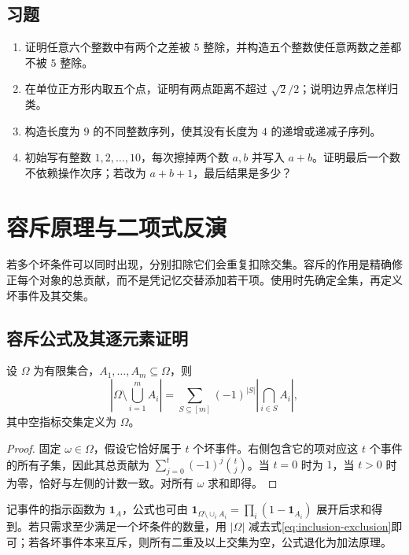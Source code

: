\documentclass[UTF8,12pt,a4paper,fontset=fandol]{ctexbook}
\begin{document}
\section{习题}
\begin{enumerate}
  \item\label{ex:pigeonhole-1} 证明任意六个整数中有两个之差被 $5$ 整除，并构造五个整数使任意两数之差都不被 $5$ 整除。
  \item\label{ex:pigeonhole-2} 在单位正方形内取五个点，证明有两点距离不超过 $\sqrt2/2$；说明边界点怎样归类。
  \item\label{ex:pigeonhole-3} 构造长度为 $9$ 的不同整数序列，使其没有长度为 $4$ 的递增或递减子序列。
  \item\label{ex:pigeonhole-4} 初始写有整数 $1,2,\ldots,10$，每次擦掉两个数 $a,b$ 并写入 $a+b$。证明最后一个数不依赖操作次序；若改为 $a+b+1$，最后结果是多少？
\end{enumerate}

\chapter{容斥原理与二项式反演}
\label{ch:inclusion-exclusion}

若多个坏条件可以同时出现，分别扣除它们会重复扣除交集。容斥的作用是精确修正每个对象的总贡献，而不是凭记忆交替添加若干项。使用时先确定全集，再定义坏事件及其交集。

\section{容斥公式及其逐元素证明}

\begin{theorem}
设 $\Omega$ 为有限集合，$A_1,\ldots,A_m\subseteq\Omega$，则
\begin{equation}
  \left|\Omega\setminus\bigcup_{i=1}^m A_i\right|
  =\sum_{S\subseteq[m]}(-1)^{|S|}
    \left|\bigcap_{i\in S}A_i\right|,
  \label{eq:inclusion-exclusion}
\end{equation}
其中空指标交集定义为 $\Omega$。
\end{theorem}
\begin{proof}
固定 $\omega\in\Omega$，假设它恰好属于 $t$ 个坏事件。右侧包含它的项对应这 $t$ 个事件的所有子集，因此其总贡献为 $\sum_{j=0}^t(-1)^j\binom tj$。当 $t=0$ 时为 $1$，当 $t>0$ 时为零，恰好与左侧的计数一致。对所有 $\omega$ 求和即得。
\end{proof}

记事件的指示函数为 $\mathbf1_A$，公式也可由 $\mathbf1_{\Omega\setminus\cup_iA_i}=\prod_i(1-\mathbf1_{A_i})$ 展开后求和得到。若只需求至少满足一个坏条件的数量，用 $|\Omega|$ 减去式\eqref{eq:inclusion-exclusion}即可；若各坏事件本来互斥，则所有二重及以上交集为空，公式退化为加法原理。
\end{document}
